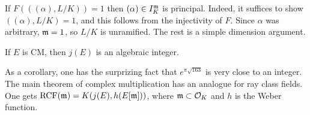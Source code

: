 If $F(((\alpha),L/K)) = 1$ then $(\alpha)\in I_K^{\mathfrak{m}}$ is principal. Indeed, it 
suffices to show $((\alpha),L/K)=1$, and this follows from the injectivity of $F$. 
Since $\alpha$ was arbitrary, $\mathfrak{m}=1$, so $L/K$ is unramified. The rest is a 
simple dimension argument. 

\begin{theo}
If $E$ is CM, then $j(E)$ is an algebraic integer. 
\end{theo}

As a corollary, one has the surprizing fact that $e^{\pi\sqrt{163}}$ is 
very close to an integer. The main theorem of complex multiplication has an 
analogue for ray class fields. One gets 
$\operatorname{RCF}(\mathfrak{m}) = K(j(E),h(E[\mathfrak{m}]))$, where $\mathfrak{m}\subset \mathcal{O}_K$ and $h$ 
is the Weber function. 




